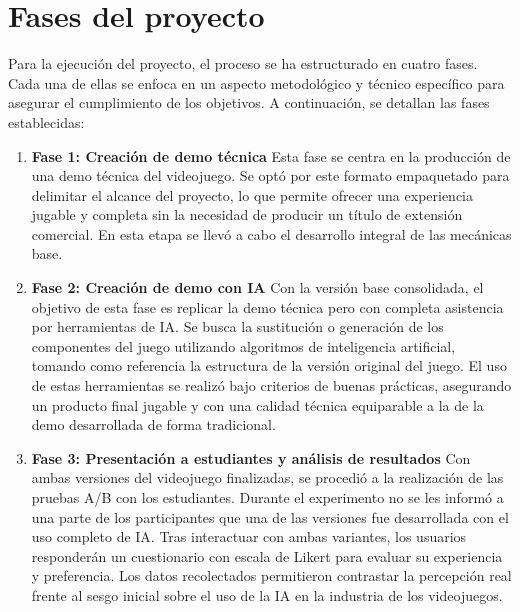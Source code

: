 \section{Fases del proyecto}

Para la ejecución del proyecto, el proceso se ha estructurado en cuatro fases. Cada una de ellas se enfoca en un aspecto metodológico y técnico específico para asegurar el cumplimiento de los objetivos. A continuación, se detallan las fases establecidas:

\begin{enumerate}
    \item \textbf{Fase 1: Creación de demo técnica}\newline
    Esta fase se centra en la producción de una demo técnica del videojuego. Se optó por este formato empaquetado para delimitar el alcance del proyecto, lo que permite ofrecer una experiencia jugable y completa sin la necesidad de producir un título de extensión comercial. En esta etapa se llevó a cabo el desarrollo integral de las mecánicas base. 
    \item \textbf{Fase 2: Creación de demo con IA}\newline
    Con la versión base consolidada, el objetivo de esta fase es replicar la demo técnica pero con completa asistencia por herramientas de IA. Se busca la sustitución o generación de los componentes del juego utilizando algoritmos de inteligencia artificial, tomando como referencia la estructura de la versión original del juego. El uso de estas herramientas se realizó bajo criterios de buenas prácticas, asegurando un producto final jugable y con una calidad técnica equiparable a la de la demo desarrollada de forma tradicional.
    \item \textbf{Fase 3: Presentación a estudiantes y análisis de resultados}\newline
    Con ambas versiones del videojuego finalizadas, se procedió a la realización de las pruebas A/B con los estudiantes. Durante el experimento no se les informó a una parte de los participantes que una de las versiones fue desarrollada con el uso completo de IA. Tras interactuar con ambas variantes, los usuarios responderán un cuestionario con escala de Likert para evaluar su experiencia y preferencia. Los datos recolectados permitieron contrastar la percepción real frente al sesgo inicial sobre el uso de la IA en la industria de los videojuegos.
\end{enumerate}

